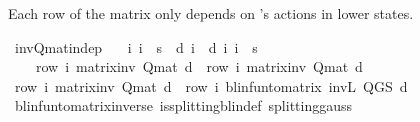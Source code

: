 \begin{isabellebody}
\endisatagproof
{\isafoldproof}%
%
\isadelimproof
%
\endisadelimproof
%
\begin{isamarkuptext}%
Each row of the matrix  only depends on 's actions in lower states.%
\end{isamarkuptext}\isamarkuptrue%
\isamarkupfalse%
\ inv{\isacharunderscore}{\kern0pt}Q{\isacharunderscore}{\kern0pt}mat{\isacharunderscore}{\kern0pt}indep{\isacharcolon}{\kern0pt}\isanewline
\ \ \ {\isachardoublequoteopen}{\isasymAnd}i{\isachardot}{\kern0pt}\ i\ {\isasymle}\ s\ {\isasymLongrightarrow}\ d\ i\ {\isacharequal}{\kern0pt}\ d{\isacharprime}{\kern0pt}\ i{\isachardoublequoteclose}\ {\isachardoublequoteopen}i\ {\isasymle}\ s{\isachardoublequoteclose}\isanewline
\ \ \ \ {\isachardoublequoteopen}row\ i\ {\isacharparenleft}{\kern0pt}matrix{\isacharunderscore}{\kern0pt}inv\ {\isacharparenleft}{\kern0pt}Q{\isacharunderscore}{\kern0pt}mat\ d{\isacharparenright}{\kern0pt}{\isacharparenright}{\kern0pt}\ {\isacharequal}{\kern0pt}\ row\ i\ {\isacharparenleft}{\kern0pt}matrix{\isacharunderscore}{\kern0pt}inv\ {\isacharparenleft}{\kern0pt}Q{\isacharunderscore}{\kern0pt}mat\ d{\isacharprime}{\kern0pt}{\isacharparenright}{\kern0pt}{\isacharparenright}{\kern0pt}{\isachardoublequoteclose}\isanewline
%
\isadelimproof
%
\endisadelimproof
%
\isatagproof
{}\isamarkupfalse%
\ {\isacharminus}{\kern0pt}\isanewline
\ \ \isamarkupfalse%
\ {\isachardoublequoteopen}row\ i\ {\isacharparenleft}{\kern0pt}matrix{\isacharunderscore}{\kern0pt}inv\ {\isacharparenleft}{\kern0pt}Q{\isacharunderscore}{\kern0pt}mat\ d{\isacharparenright}{\kern0pt}{\isacharparenright}{\kern0pt}\ {\isacharequal}{\kern0pt}\ row\ i\ {\isacharparenleft}{\kern0pt}blinfun{\isacharunderscore}{\kern0pt}to{\isacharunderscore}{\kern0pt}matrix\ {\isacharparenleft}{\kern0pt}inv\isactrlsub L\ {\isacharparenleft}{\kern0pt}Q{\isacharunderscore}{\kern0pt}GS\ d{\isacharparenright}{\kern0pt}{\isacharparenright}{\kern0pt}{\isacharparenright}{\kern0pt}{\isachardoublequoteclose}\isanewline
\ \ \ \ \isamarkupfalse%
\ blinfun{\isacharunderscore}{\kern0pt}to{\isacharunderscore}{\kern0pt}matrix{\isacharunderscore}{\kern0pt}inverse{\isacharparenleft}{\kern0pt}{}{\isacharparenright}{\kern0pt}\ is{\isacharunderscore}{\kern0pt}splitting{\isacharunderscore}{\kern0pt}blin{\isacharunderscore}{\kern0pt}def{\isacharprime}{\kern0pt}\ splitting{\isacharunderscore}{\kern0pt}gauss\isanewline
\ \ \ \ \isamarkupfalse%

\end{isabellebody}
